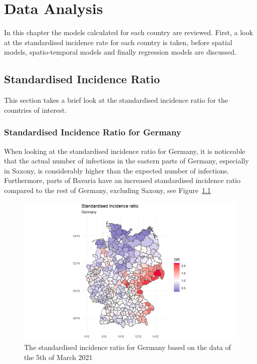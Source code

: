 %
\chapter{Data Analysis}
\label{sec:analysis}
In this chapter the models calculated for each country are reviewed. First, a look at the standardised incidence rate for each country is taken, before spatial models, spatio-temporal models and finally regression models are discussed.
\section{Standardised Incidence Ratio}
This section takes a brief look at the standardised incidence ratio for the countries of interest.
\subsection{Standardised Incidence Ratio for Germany}
When looking at the standardised incidence ratio for Germany, it is noticeable that the actual number of infections in the eastern parts of Germany, especially in Saxony, is considerably higher than the expected number of infections. Furthermore, parts of Bavaria have an increased standardised incidence ratio compared to the rest of Germany, excluding Saxony, see Figure~\ref{sirgermany}
%   
\begin{figure}[H]
  \centering
  \includegraphics[width = 1.2\textwidth]{sir_germany.png}
  \caption{The standardised incidence ratio for Germany based on the data of the 5th of March 2021}
  \label{sirgermany}
\end{figure}
